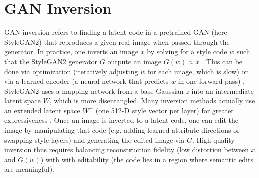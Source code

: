\section{GAN Inversion}

GAN inversion refers to finding a latent code in a pretrained GAN (here StyleGAN2) that reproduces a given real image when passed through the generator. In practice, one inverts an image $x$ by solving for a style code $w$ such that the StyleGAN2 generator 
$G$ outputs an image $G(w) \approx x$ \citep{tov2021designingencoderstyleganimage}.
This can be done via optimization (iteratively adjusting 
$w$ for each image, which is slow) or via a learned encoder (a neural network that predicts $w$ in one forward pass) \citep{alaluf2021restyleresidualbasedstyleganencoder,tov2021designingencoderstyleganimage}.
StyleGAN2 uses a mapping network from a base Gaussian $z$ into an intermediate latent space $W$, which is more disentangled.
Many inversion methods actually use an extended latent space $W^+$  (one 512-D style vector per layer) for greater expressiveness \citep{richardson2021encodingstylestyleganencoder,tov2021designingencoderstyleganimage,bobkov2024devildetailsstylefeatureeditordetailrich}.
Once an image is inverted to a latent code, one can edit the image by manipulating that code (e.g. adding learned attribute directions or swapping style layers) and generating the edited image via $G$.
High-quality inversion thus requires balancing reconstruction fidelity (low distortion between $x$ and $G(w)$) with with editability (the code lies in a region where semantic edits are meaningful).

